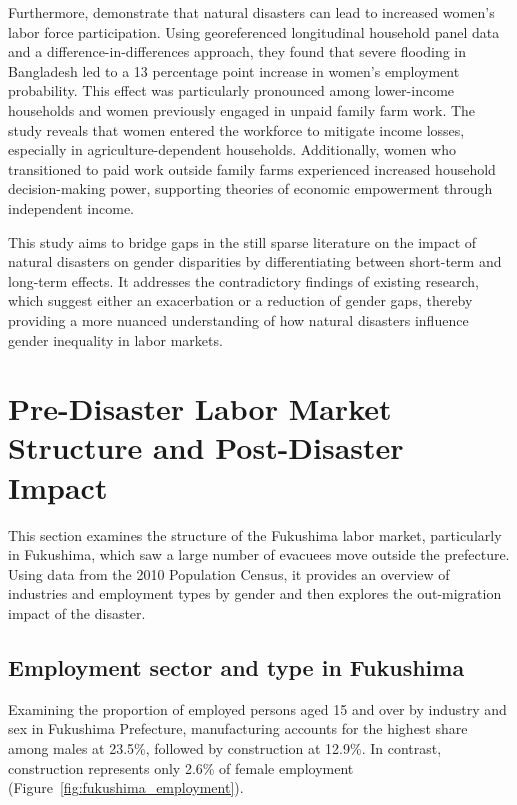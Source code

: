 \documentclass[a4paper,12pt]{article}
\begin{document}
Furthermore, \citet{Canessa2021WomensShocks} demonstrate that natural disasters can lead to increased women's labor force participation. Using georeferenced longitudinal household panel data and a difference-in-differences approach, they found that severe flooding in Bangladesh led to a 13 percentage point increase in women's employment probability. This effect was particularly pronounced among lower-income households and women previously engaged in unpaid family farm work. The study reveals that women entered the workforce to mitigate income losses, especially in agriculture-dependent households. Additionally, women who transitioned to paid work outside family farms experienced increased household decision-making power, supporting theories of economic empowerment through independent income.

This study aims to bridge gaps in the still sparse literature on the impact of natural disasters on gender disparities by differentiating between short-term and long-term effects. It addresses the contradictory findings of existing research, which suggest either an exacerbation or a reduction of gender gaps, thereby providing a more nuanced understanding of how natural disasters influence gender inequality in labor markets.


\section{Pre-Disaster Labor Market Structure and Post-Disaster Impact}
\label{sec4}

This section examines the structure of the Fukushima labor market, particularly in Fukushima, which saw a large number of evacuees move outside the prefecture. Using data from the 2010 Population Census, it provides an overview of industries and employment types by gender and then explores the out-migration impact of the disaster.

\subsection{Employment sector and type in Fukushima}
\label{sec4.1}

Examining the proportion of employed persons aged 15 and over by industry and sex in Fukushima Prefecture, manufacturing accounts for the highest share among males at 23.5\%, followed by construction at 12.9\%. In contrast, construction represents only 2.6\% of female employment (Figure~\ref{fig:fukushima_employment}).
\end{document}
